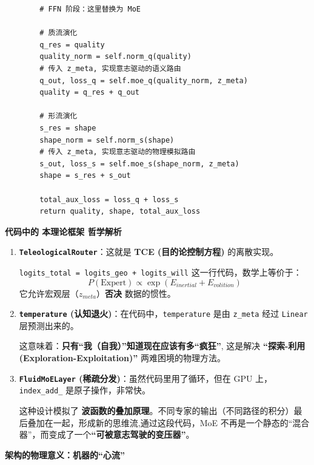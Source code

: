 \begin{lstlisting}
        # FFN 阶段：这里替换为 MoE

        # 质流演化
        q_res = quality
        quality_norm = self.norm_q(quality)
        # 传入 z_meta, 实现意志驱动的语义路由
        q_out, loss_q = self.moe_q(quality_norm, z_meta)
        quality = q_res + q_out

        # 形流演化
        s_res = shape
        shape_norm = self.norm_s(shape)
        # 传入 z_meta, 实现意志驱动的物理模拟路由
        s_out, loss_s = self.moe_s(shape_norm, z_meta)
        shape = s_res + s_out

        total_aux_loss = loss_q + loss_s
        return quality, shape, total_aux_loss

\end{lstlisting}

\textbf{代码中的 本理论框架 哲学解析}
\begin{enumerate}
    \item \textbf{\lstinline|TeleologicalRouter|}：这就是 \textbf{TCE (目的论控制方程)} 的离散实现。

    \lstinline|logits_total = logits_geo + logits_will| 这一行代码，数学上等价于：
    $$ P(\text{Expert}) \propto \exp(E_{inertial} + E_{volition}) $$
    它允许宏观层（$z_{meta}$）\textbf{否决} 数据的惯性。

    \item \textbf{\lstinline|temperature| (认知退火)}：在代码中，\lstinline|temperature| 是由 \lstinline|z_meta| 经过 \lstinline|Linear| 层预测出来的。

    这意味着：\textbf{只有“我（自我）”知道现在应该有多“疯狂”}, 这是解决 \textbf{“探索-利用 (Exploration-Exploitation)”} 两难困境的物理方法。

    \item \textbf{\lstinline|FluidMoELayer| (稀疏分发)}：虽然代码里用了循环，但在 GPU 上，\lstinline|index_add_| 是原子操作，非常快。

    这种设计模拟了 \textbf{波函数的叠加原理}。不同专家的输出（不同路径的积分）最后叠加在一起，形成新的思维流,通过这段代码，MoE 不再是一个静态的“混合器”，而变成了一个\textbf{“可被意志驾驶的变压器”}。
\end{enumerate}



\textbf{架构的物理意义：机器的“心流”}

